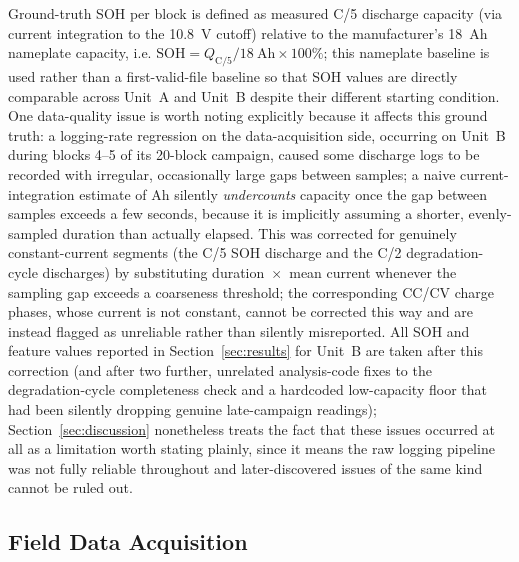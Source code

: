 \documentclass[conference]{IEEEtran}
\begin{document}
Ground-truth SOH per block is defined as measured C/5 discharge capacity (via current integration to the 10.8~V cutoff) relative to the manufacturer's 18~Ah nameplate capacity, i.e. $\mathrm{SOH} = Q_{\mathrm{C/5}} / 18~\mathrm{Ah} \times 100\%$; this nameplate baseline is used rather than a first-valid-file baseline so that SOH values are directly comparable across Unit~A and Unit~B despite their different starting condition. One data-quality issue is worth noting explicitly because it affects this ground truth: a logging-rate regression on the data-acquisition side, occurring on Unit~B during blocks 4--5 of its 20-block campaign, caused some discharge logs to be recorded with irregular, occasionally large gaps between samples; a naive current-integration estimate of Ah silently \emph{undercounts} capacity once the gap between samples exceeds a few seconds, because it is implicitly assuming a shorter, evenly-sampled duration than actually elapsed. This was corrected for genuinely constant-current segments (the C/5 SOH discharge and the C/2 degradation-cycle discharges) by substituting duration~$\times$~mean current whenever the sampling gap exceeds a coarseness threshold; the corresponding CC/CV charge phases, whose current is not constant, cannot be corrected this way and are instead flagged as unreliable rather than silently misreported. All SOH and feature values reported in Section~\ref{sec:results} for Unit~B are taken after this correction (and after two further, unrelated analysis-code fixes to the degradation-cycle completeness check and a hardcoded low-capacity floor that had been silently dropping genuine late-campaign readings); Section~\ref{sec:discussion} nonetheless treats the fact that these issues occurred at all as a limitation worth stating plainly, since it means the raw logging pipeline was not fully reliable throughout and later-discovered issues of the same kind cannot be ruled out.

\subsection{Field Data Acquisition}
\label{sec:fielddata}
\end{document}

